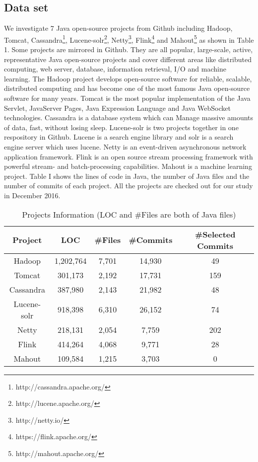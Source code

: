 \subsection{Data set}
\label{sec:method:data}
We investigate 7 Java open-source projects from Github including Hadoop, Tomcat, Cassandra\footnote{http://cassandra.apache.org/}, Lucene-solr\footnote{http://lucene.apache.org/}, Netty\footnote{http://netty.io/}, Flink\footnote{https://flink.apache.org/} and Mahout\footnote{http://mahout.apache.org/} as shown in Table 1. Some projects are mirrored in Github. They are all popular, large-scale, active, representative Java open-source projects and cover different areas like distributed computing, web server, database, information retrieval, I/O and machine learning. The Hadoop project develops open-source software for reliable, scalable, distributed computing and has become one of the most famous Java open-source software for many years. Tomcat is the most popular implementation of the Java Servlet, JavaServer Pages, Java Expression Language and Java WebSocket technologies. Cassandra \cite{journals/sigops/LakshmanM10} is a database system which can Manage massive amounts of data, fast, without losing sleep. Lucene-solr is two projects together in one respository in Github. Lucene is a search engine library and solr is a search engine server which uses lucene. Netty is an event-driven asynchronous network application framework. Flink is an open source stream processing framework with powerful stream- and batch-processing capabilities. Mahout is a machine learning project. Table I shows the lines of code in Java, the number of Java files and the number of commits of each project. All the projects are checked out for our study in December 2016.

\begin{table}
	\centering
	\caption{Projects Information (LOC and \#Files are both of Java files)}
	\begin{tabular}{|c|c|c|c|c|}\hline
		Project&LOC&\#Files&\#Commits&\#Selected Commits\\\hline
		Hadoop&1,202,764&7,701&14,930&49\\\hline
		Tomcat&301,173&2,192&17,731&159\\\hline
		Cassandra&387,980&2,143&21,982&48\\\hline
		Lucene-solr&918,398&6,310&26,152&74\\\hline
		Netty&218,131&2,054&7,759&202\\\hline
		Flink&414,264&4,068&9,771&28\\\hline
		Mahout&109,584&1,215&3,703&0\\\hline
	\end{tabular}
\end{table}

